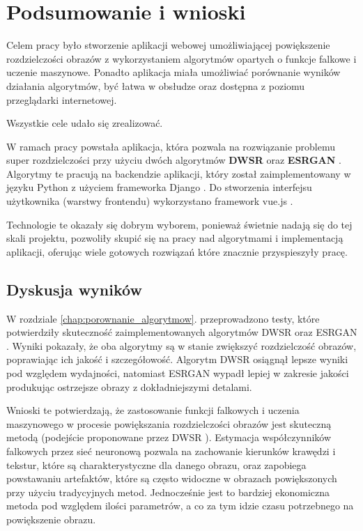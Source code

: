 \chapter{Podsumowanie i wnioski} \label{chap:podsumowanie}

Celem pracy było stworzenie aplikacji webowej umożliwiającej powiększenie rozdzielczości obrazów z wykorzystaniem algorytmów opartych o funkcje falkowe i uczenie maszynowe. Ponadto aplikacja miała umożliwiać porównanie wyników działania algorytmów, być łatwa w obsłudze oraz dostępna z poziomu przeglądarki internetowej.

Wszystkie cele udało się zrealizować. 

W ramach pracy powstała aplikacja, która pozwala na rozwiązanie problemu super rozdzielczości przy użyciu dwóch algorytmów \textbf{DWSR} \cite{guo2017deep} oraz \textbf{ESRGAN} \cite{wang2018esrgan}. Algorytmy te pracują na backendzie aplikacji, który został zaimplementowany w języku Python z użyciem frameworka Django \cite{django}. Do stworzenia interfejsu użytkownika (warstwy frontendu) wykorzystano framework vue.js \cite{vue}. 

Technologie te okazały się dobrym wyborem, ponieważ świetnie nadają się do tej skali projektu, pozwoliły skupić się na pracy nad algorytmami i implementacją aplikacji, oferując wiele gotowych rozwiązań które znacznie przyspieszyły pracę.


\section{Dyskusja wyników}

W rozdziale \ref{chap:porownanie_algorytmow}. przeprowadzono testy, które potwierdziły skuteczność zaimplementowanych algorytmów DWSR \cite{guo2017deep} oraz ESRGAN \cite{wang2018esrgan}. Wyniki pokazały, że oba algorytmy są w stanie zwiększyć rozdzielczość obrazów, poprawiając ich jakość i szczegółowość. Algorytm DWSR osiągnął lepsze wyniki pod względem wydajności, natomiast ESRGAN wypadł lepiej w zakresie jakości produkując ostrzejsze obrazy z dokładniejszymi detalami.

Wnioski te potwierdzają, że zastosowanie funkcji falkowych i uczenia maszynowego w procesie powiększania rozdzielczości obrazów jest skuteczną metodą (podejście proponowane przez DWSR \cite{guo2017deep}). Estymacja współczynników falkowych przez sieć neuronową pozwala na zachowanie kierunków krawędzi i tekstur, które są charakterystyczne dla danego obrazu, oraz zapobiega powstawaniu artefaktów, które są często widoczne w obrazach powiększonych przy użyciu tradycyjnych metod. Jednocześnie jest to bardziej ekonomiczna metoda pod względem ilości parametrów, a co za tym idzie czasu potrzebnego na powiększenie obrazu.

